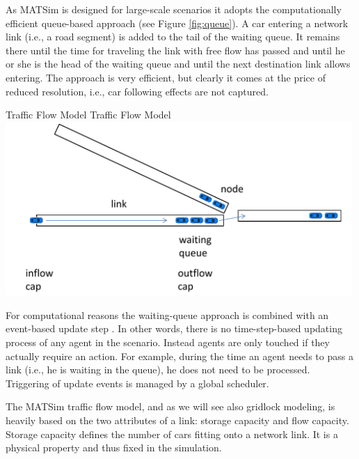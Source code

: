 As MATSim is designed for large-scale scenarios it adopts the computationally efficient queue-based approach (see Figure \ref{fig:queue}). A car entering a network link (i.e., a road segment) is added to the tail of the waiting queue. It remains there until the time for traveling the link with free flow has passed and until he or she is the head of the waiting queue and until the next destination link allows entering. The approach is very efficient, but clearly it comes at the price of reduced resolution, i.e., car following effects are not captured.   

\createfigure%
{Traffic Flow Model}%
{Traffic Flow Model}%
{\label{fig:queue}}%
{\includegraphics[width=0.99\textwidth, angle=0]{using/figures/queue.pdf}}%
{}

For computational reasons the waiting-queue approach is combined with an event-based update step \citep[][]{CharyparEtAl_TRB_2009}. In other words, there is no time-step-based updating process of any agent in the scenario. 
%
%
Instead agents are only touched if they actually require an action. For example, during the time an agent needs to pass a link (i.e., he is waiting in the queue), he does not need to be processed.    Triggering of update events is managed by a global scheduler.

The MATSim traffic flow model, and as we will see also gridlock modeling, is heavily based on the two attributes of a link: storage capacity and flow capacity. Storage capacity defines the number of cars fitting onto a network link. It is a physical property and thus fixed in the simulation. 

